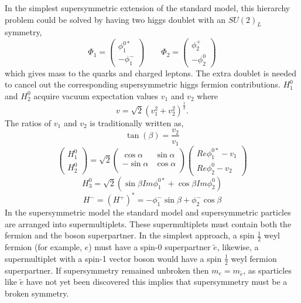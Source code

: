 In the simplest supersymmetric extension of the standard model,
this hierarchy problem could be solved by having two higgs doublet 
with an $SU(2)_{L}$ symmetry,
\begin{equation}
\Phi_{1}=
\left(
    \begin{array}{c}
      \phi_{1}^{0*} \\
      -\phi_{1}^{-}
    \end{array}
  \right) 
 \qquad
\Phi_{2}=
\left(
    \begin{array}{c}
      \phi_{2}^{+} \\
      -\phi_{2}^{0}
    \end{array}
  \right) 
\end{equation}
which gives mass to the quarks and charged leptons. The extra doublet
is needed to cancel out the corresponding supersymmetric higgs fermion
contributions.
$H_{1}^{0}$ and $H_{2}^{0}$ acquire vacuum expectation values $v_{1}$ and $v_{2}$ where
\begin{equation}
v = \sqrt{2}(v_{1}^{2}+v_{2}^{2})^{\frac{1}{2}}.
\end{equation}
The ratios of $v_{1}$ and $v_{2}$ is traditionally written as,
\begin{equation}
\tan(\beta)=\frac{v_{2}}{v_{1}}
\end{equation}
\begin{equation}
\left(
    \begin{array}{c}
      H^{0}_{1} \\
     H^{0}_{2}
    \end{array}
  \right) 
  =
  \sqrt{2}
  \begin{pmatrix}
  \cos{\alpha} & \sin{\alpha}\\
  -\sin{\alpha}& \cos{\alpha}\\
  \end{pmatrix}
\left(
      \begin{array}{c}
      Re{\phi}_{1}^{0*}-v_{1} \\
     Re{\phi}_{2}^{0}-v_{2}
    \end{array}
  \right) 
\end{equation}
\begin{equation}
H_{3}^{0}=\sqrt{2}(\sin{\beta}Im\phi_{1}^{0*}+\cos{\beta}Im\phi^{0}_{2})
\end{equation}
\begin{equation}
H^{-}=(H^{+})^{*}=-\phi_{1}^{-}\sin{\beta}+\phi_{2}^{-}\cos{\beta}
\end{equation}
In the supersymmetric model the standard model and supersymmetric particles are arranged
into supermultiplets. These supermultiplets must contain both the fermion
and the boson superpartner. In the simplest approach, a  spin $\frac{1}{2}$
weyl fermion (for example, $e$) must have %
a spin-0 superpartner $\tilde{e}$, likewise, a supermultiplet with a spin-1 vector boson would have
 a spin $\frac{1}{2}$ weyl fermion superpartner.
 If supersymmetry remained unbroken
then $m_{e}=m_{\tilde{e}}$, as sparticles like $\tilde{e}$ have not 
yet been discovered this implies that supersymmetry must be a broken
symmetry.

